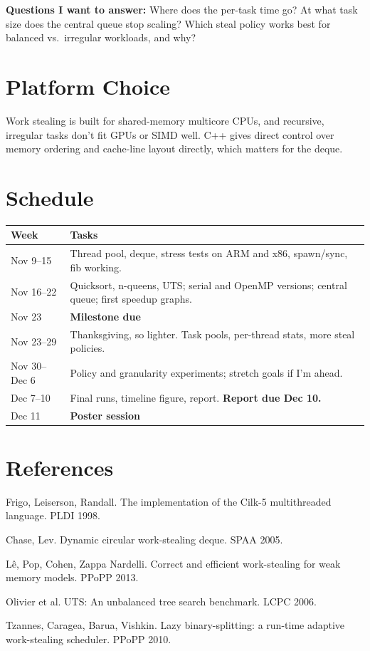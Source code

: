 \documentclass[11pt]{article}
\begin{document}
\medskip
\noindent\textbf{Questions I want to answer:} Where does the per-task time go?
At what task size does the central queue stop scaling? Which steal policy works
best for balanced vs.\ irregular workloads, and why?

\section*{Platform Choice}
Work stealing is built for shared-memory multicore CPUs, and recursive, irregular
tasks don't fit GPUs or SIMD well. C++ gives direct control over memory ordering and
cache-line layout directly, which matters for the deque.

\section*{Schedule}
\begin{tabular}{@{}lp{}@{}}
\toprule
\textbf{Week} & \textbf{Tasks} \\
\midrule
Nov 9--15     & Thread pool, deque, stress tests on ARM and x86, spawn/sync, fib working. \\
Nov 16--22    & Quicksort, n-queens, UTS; serial and OpenMP versions; central queue;
                first speedup graphs. \\
Nov 23        & \textbf{Milestone due} \\
Nov 23--29    & Thanksgiving, so lighter. Task pools, per-thread stats, more steal policies. \\
Nov 30--Dec 6 & Policy and granularity experiments; stretch goals if I'm ahead. \\
Dec 7--10     & Final runs, timeline figure, report. \textbf{Report due Dec 10.} \\
Dec 11        & \textbf{Poster session} \\
\bottomrule
\end{tabular}

\section*{References}
\begin{enumerate}[label={[\arabic*]}]
  \item Frigo, Leiserson, Randall. The implementation of the Cilk-5 multithreaded language. PLDI 1998.
  \item Chase, Lev. Dynamic circular work-stealing deque. SPAA 2005.
  \item L\^e, Pop, Cohen, Zappa Nardelli. Correct and efficient work-stealing for weak memory models. PPoPP 2013.
  \item Olivier et al. UTS: An unbalanced tree search benchmark. LCPC 2006.
  \item Tzannes, Caragea, Barua, Vishkin. Lazy binary-splitting: a run-time adaptive work-stealing scheduler. PPoPP 2010.
\end{enumerate}
\end{document}
